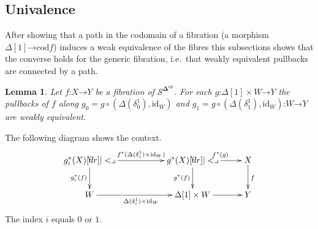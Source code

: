 \documentclass{amsart}
\theoremstyle{plain}
\newtheorem{lemma}[theorem]{Lemma}
\theoremstyle{definition}
\newcommand\cat\mathcal
\newcommand\id{\mathrm{id}}
\newcommand\cod{\mathrm{cod}}
\newcommand\ri{^*}
\newcommand\dual{^{\mathrm{op}}}
\newcommand\simCat{\mathbf\Delta}
\newcommand\s{^{\simCat\dual}}
\newcommand\of{\mathord:}
\renewcommand\to{\mathord\rightarrow}
\newcommand\simplex\Delta
\begin{document}
\subsection{Univalence}
After showing that a path in the codomain of a fibration (a morphism $\simplex[1]\to\cod f$) induces a weak equivalence of the fibres this subsections shows that the converse holds for the generic fibration, i.e.\ that weakly equivalent pullbacks are connected by a path.

\begin{lemma} Let $f\of X\to Y$ be a fibration of $\cat S\s$. For each $g\of \simplex[1]\times W\to Y$ the pullbacks of $f$ along $g_0=g\circ (\simplex(\delta^1_0),\id_W)$ and $g_1=g\circ(\simplex(\delta^1_1),\id_W)\of W\to Y$ are weakly equivalent. \end{lemma}

The following diagram shows the context.
\[\xymatrix{
 g_i\ri(X) \ar[rr]^{f\ri(\simplex(\delta^1_i)\times \id_W)} \ar[d]_{g_i\ri(f)} \pb && g\ri(X) \ar[r]^{f\ri(g)} \ar[d]_{g\ri(f)} \pb & X\ar[d]^f\\
 W \ar[rr]_{\simplex(\delta^1_i)\times \id_W} && \simplex[1]\times W \ar[r] & Y\\
}\]
The index $i$ equals $0$ or $1$. 
\end{document}
